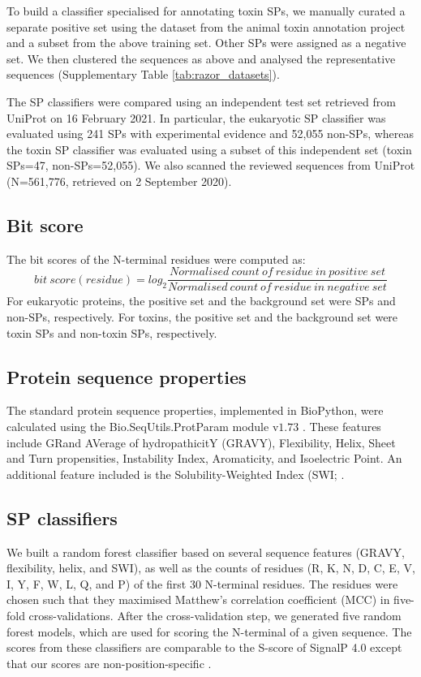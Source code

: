 To build a classifier specialised for annotating toxin SPs, we manually curated a separate positive set using the dataset from the animal toxin annotation project \cite{Jungo2012-ja} and a subset from the above training set. Other SPs were assigned as a negative set. We then clustered the sequences as above and analysed the representative sequences (Supplementary Table \ref{tab:razor_datasets}).

The SP classifiers were compared using an independent test set retrieved from UniProt on 16 February 2021. In particular, the eukaryotic SP classifier was evaluated using 241 SPs with experimental evidence and 52,055 non-SPs, whereas the toxin SP classifier was evaluated using a subset of this independent set (toxin SPs=47, non-SPs=52,055). We also scanned the reviewed sequences from UniProt (N=561,776, retrieved on 2 September 2020).

\subsection{Bit score}
The bit scores of the N-terminal residues were computed as:
%
\begin{equation}
    bit\ score (residue) = log_2 \frac{Normalised\ count\ of\ residue\ in\ positive\ set}{Normalised\ count\ of\ residue\ in\ negative\ set}
\end{equation}
%
For eukaryotic proteins, the positive set and the background set were SPs and non-SPs, respectively. For toxins, the positive set and the background set were toxin SPs and non-toxin SPs, respectively.


\subsection{Protein sequence properties}
The standard protein sequence properties, implemented in BioPython, were calculated using the Bio.SeqUtils.ProtParam module v$1.73$ \cite{Cock2009-ym}. These features include GRand AVerage of hydropathicitY (GRAVY), Flexibility, Helix, Sheet and Turn propensities, Instability Index, Aromaticity, and Isoelectric Point. An additional feature included is the Solubility-Weighted Index (SWI; \cite{Bhandari2020-pz}.

\subsection{SP classifiers}
We built a random forest classifier based on several sequence features (GRAVY, flexibility, helix, and SWI), as well as the counts of residues (R, K, N, D, C, E, V, I, Y, F, W, L, Q, and P) of the first 30 N-terminal residues. The residues were chosen such that they maximised Matthew's correlation coefficient (MCC) in five-fold cross-validations. After the cross-validation step, we generated five random forest models, which are used for scoring the N-terminal of a given sequence. The scores from these classifiers are comparable to the S-score of SignalP 4.0 except that our scores are non-position-specific \cite{Petersen2011-ex}.

